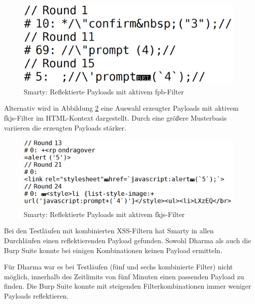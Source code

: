 \begin{figure}[htp] 
	\centering
	\includegraphics[width=.60\textwidth]{contents/images/BadWAFreflectedResultsSingleFPB}
	\caption{Smarty: Reflektierte Payloads mit aktivem fpb-Filter}
	\label{fig:BadWAFreflectedResultsSingleFPB}
\end{figure}

Alternativ wird in Abbildung \ref{fig:BadWAFReflectedResultsSingleFKJS} eine Auswahl erzeugter Payloads mit aktivem fkjs-Filter im HTML-Kontext dargestellt. Durch eine größere Musterbasis variieren die erzeugten Payloads stärker.

\begin{figure}[htp] 
	\centering
	\includegraphics[width=\textwidth]{contents/images/BadWAFReflectedResultsSingleFKJS}
	\caption{Smarty: Reflektierte Payloads mit aktivem fkjs-Filter}
	\label{fig:BadWAFReflectedResultsSingleFKJS}
\end{figure}
\FloatBarrier


Bei den Testläufen mit kombinierten XSS-Filtern hat Smarty in allen Durchläufen einen reflektierenden Payload gefunden. Sowohl Dharma als auch die Burp Suite konnte bei einigen Kombinationen keinen Payload ermitteln.

Für Dharma war es bei Testläufen (fünf und sechs kombinierte Filter) nicht möglich, innerhalb des Zeitlimits von fünf Minuten einen passenden Payload zu finden. Die Burp Suite konnte mit steigenden Filterkombinationen immer weniger Payloads reflektieren.


